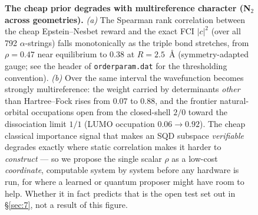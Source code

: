 \documentclass[onecolumn,a4paper]{quantumarticle}
\begin{document}
\begin{figure}[tbp]
\centering
{}
\caption{\textbf{The cheap prior degrades with multireference character (N$_2$ across geometries).} \emph{(a)} The Spearman rank correlation between the cheap Epstein--Nesbet reward and the exact FCI $|c|^2$ (over all 792 $\alpha$-strings) falls monotonically as the triple bond stretches, from $\rho{=}0.47$ near equilibrium to $0.38$ at $R{=}2.5$~\AA{} (symmetry-adapted gauge; see the header of \texttt{orderparam.dat} for the thresholding convention). \emph{(b)} Over the same interval the wavefunction becomes strongly multireference: the weight carried by determinants \emph{other} than Hartree--Fock rises from $0.07$ to $0.88$, and the frontier natural-orbital occupations open from the closed-shell $2/0$ toward the dissociation limit $1/1$ (LUMO occupation $0.06\to0.92$). The cheap classical importance signal that makes an SQD subspace \emph{verifiable} degrades exactly where static correlation makes it harder to \emph{construct} --- so we propose the single scalar $\rho$ as a low-cost \emph{coordinate}, computable system by system before any hardware is run, for where a learned or quantum proposer might have room to help. Whether it in fact predicts that is the open test set out in \S\ref{sec:7}, not a result of this figure.}
\label{fig:orderparam}
\end{figure}
\end{document}
